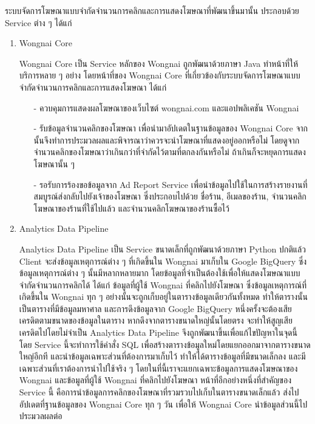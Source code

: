 ระบบจัดการโฆษณาแบบจำกัดจำนวนการคลิกและการแสดงโฆษณาที่พัฒนาขึ้นมานั้น ประกอบด้วย Service ต่าง ๆ ได้แก่
\begin{enumerate}
	\item Wongnai Core
	
	Wongnai Core เป็น Service หลักของ Wongnai ถูกพัฒนาด้วยภาษา Java ทำหน้าที่ให้บริการหลาย ๆ อย่าง โดยหน้าที่ของ Wongnai Core ที่เกี่ยวข้องกับระบบจัดการโฆษณาแบบจำกัดจำนวนการคลิกและการแสดงโฆษณา ได้แก่ 
	\begin{itemize}
		\item[-] ควบคุมการแสดงผลโฆษณาของเว็บไซต์ wongnai.com และแอปพลิเคชัน Wongnai
		\item[-] รับข้อมูลจำนวนคลิกของโฆษณา เพื่อนำมาอัปเดตในฐานข้อมูลของ Wongnai Core จากนั้นจึงทำการประมวลผลและพิจารณาว่าควรจะนำโฆษณาที่แสดงอยู่ออกหรือไม่ โดยดูจากจำนวนคลิกของโฆษณาว่าเกินกว่าที่จำกัดไว้ตามที่ตกลงกันหรือไม่ ถ้าเกินก็จะหยุดการแสดงโฆษณานั้น ๆ
		\item[-] รอรับการร้องขอข้อมูลจาก Ad Report Service เพื่อนำข้อมูลไปใช้ในการสร้างรายงานที่สมบูรณ์ส่งกลับไปยังเจ้าของโฆษณา ซึ่งประกอบไปด้วย ชื่อร้าน, อีเมลของร้าน, จำนวนคลิกโฆษณาของร้านที่ใช้ไปแล้ว และจำนวนคลิกโฆษณาของร้านซื้อไว้
	\end{itemize}
	\item Analytics Data Pipeline
	
	Analytics Data Pipeline เป็น Service ขนาดเล็กที่ถูกพัฒนาด้วยภาษา Python ปกติแล้ว Client จะส่งข้อมูลเหตุการณ์ต่าง ๆ ที่เกิดขึ้นใน Wongnai มาเก็บใน Google BigQuery ซึ่งข้อมูลเหตุการณ์ต่าง ๆ นั้นมีหลากหลายมาก โดยข้อมูลที่จำเป็นต้องใช้เพื่อให้แสดงโฆษณาแบบจำกัดจำนวนการคลิกได้ ได้แก่ ข้อมูลที่ผู้ใช้ Wongnai ที่คลิกไปยังโฆษณา ซึ่งข้อมูลเหตุการณ์ที่เกิดขึ้นใน Wongnai ทุก ๆ อย่างนั้นจะถูกเก็บอยู่ในตารางข้อมูลเดียวกันทั้งหมด ทำให้ตารางนั้นเป็นตารางที่มีข้อมูลมหาศาล และการดึงข้อมูลจาก Google BigQuery หนึ่งครั้งจะต้องเสียเครดิตตามขนาดของข้อมูลในตาราง หากดึงจากตารางขนาดใหญ่นั้นโดยตรง จะทำให้สูญเสียเครดิตไปโดยไม่จำเป็น Analytics Data Pipeline จึงถูกพัฒนาขึ้นเพื่อแก้ไขปัญหาในจุดนี้ โดย Service นี้จะทำการใช้คำสั่ง SQL เพื่อสร้างตารางข้อมูลใหม่โดยแยกออกมาจากตารางขนาดใหญ่อีกที และนำข้อมูลเฉพาะส่วนที่ต้องการมาเก็บไว้ ทำให้ได้ตารางข้อมูลที่มีขนาดเล็กลง และมีเฉพาะส่วนที่เราต้องการนำไปใช้จริง ๆ โดยในที่นี้เราจะแยกเฉพาะข้อมูลการแสดงโฆษณาของ Wongnai และข้อมูลที่ผู้ใช้ Wongnai ที่คลิกไปยังโฆษณา หน้าที่อีกอย่างหนึ่งที่สำคัญของ Service นี้ คือการนำข้อมูลการคลิกของโฆษณาที่รวมรวบไปเก็บในตารางขนาดเล็กแล้ว ส่งไปอัปเดตที่ฐานข้อมูลของ Wongnai Core ทุก ๆ วัน เพื่อให้ Wongnai Core นำข้อมูลส่วนนี้ไปประมวลผลต่อ


\end{enumerate}
